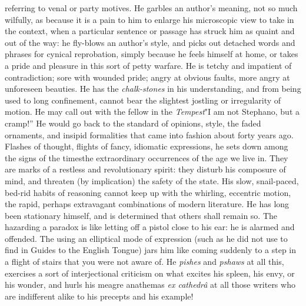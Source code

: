 referring to venal or party motives.  He garbles an author's
meaning, not so much wilfully, as because it is a pain to him to
enlarge his microscopic view to take in the context, when a
particular sentence or passage has struck him as quaint and out of
the way: he fly-blows an author's style, and picks out detached
words and phrases for cynical reprobation, simply because he feels
himself at home, or takes a pride and pleasure in this sort of
petty warfare. He is tetchy and impatient of contradiction; sore
with wounded pride; angry at obvious faults, more angry at
unforeseen beauties. He has the \emph{chalk-stones} in his
understanding, and from being used to long confinement, cannot
bear the slightest jostling or irregularity of motion. He may call
out with the fellow in the \emph{Tempest}\textemdash "I am not
Stephano, but a cramp!'' He would go back to the standard of
opinions, style, the faded ornaments, and insipid formalities that
came into fashion about forty years ago. Flashes of thought,
flights of fancy, idiomatic expressions, he sets down among the
signs of the times\textemdash the extraordinary occurrences of the
age we live in. They are marks of a restless and revolutionary
spirit: they disturb his composure of mind, and threaten (by
implication) the safety of the state. His slow, snail-paced,
bed-rid habits of reasoning cannot keep up with the whirling,
eccentric motion, the rapid, perhaps extravagant combinations of
modern literature. He has long been stationary himself, and is
determined that others shall remain so. The hazarding a paradox is
like letting off a pistol close to his ear: he is alarmed and
offended. The using an elliptical mode of expression (such as he
did not use to find in Guides to the English Tongue) jars him like
coming suddenly to a step in a flight of stairs that you were not
aware of. He \emph{pishes} and \emph{pshaws} at all this,
exercises a sort of interjectional criticism on what excites his
spleen, his envy, or his wonder, and hurls his meagre anathemas
\emph{ex cathedr\^{a}} at all those writers who are indifferent
alike to his precepts and his example!


